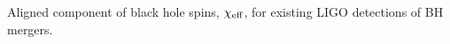  \label{fig:BHspin} Aligned component of black hole spins, $\chi_{\rm eff}$, for existing LIGO detections of BH mergers.